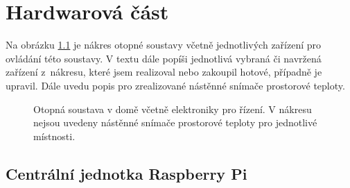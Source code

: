 \chapter{Hardwarová část}

Na obrázku \ref{fig:otopna-soustava-a-elektronika-rez-domu} je nákres otopné soustavy včetně jednotlivých zařízení pro ovládání této soustavy. V textu dále popíši jednotlivá vybraná či navržená zařízení z~nákresu, které jsem realizoval nebo zakoupil hotové, případně je upravil. Dále uvedu popis pro zrealizované nástěnné snímače prostorové teploty.

\newpage

\begin{figure}[H]
    \centering
    \def\svgwidth{\columnwidth}
    
    \caption[Otopná soustava v domě včetně elektroniky pro řízení.]{Otopná soustava v domě včetně elektroniky pro řízení. V nákresu nejsou uvedeny nástěnné snímače prostorové teploty pro jednotlivé místnosti.}
    \label{fig:otopna-soustava-a-elektronika-rez-domu}
\end{figure}


\section{Centrální jednotka Raspberry Pi}

